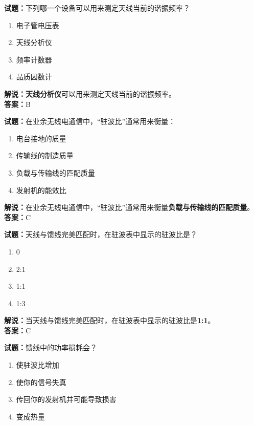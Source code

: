 \documentclass{ctexbook}
\begin{document}
\noindent\textbf{试题：}下列哪一个设备可以用来测定天线当前的谐振频率？

\begin{enumerate}[leftmargin=3em]
  \item 电子管电压表
  \item 天线分析仪
  \item 频率计数器
  \item 品质因数计
\end{enumerate}

\noindent\textbf{解说：}\textbf{天线分析仪}可以用来测定天线当前的谐振频率。\\\noindent\textbf{答案：}B

\vspace{\baselineskip}

\noindent\textbf{试题：}在业余无线电通信中，“驻波比”通常用来衡量：

\begin{enumerate}[leftmargin=3em]
  \item 电台接地的质量
  \item 传输线的制造质量
  \item 负载与传输线的匹配质量
  \item 发射机的能效比
\end{enumerate}

\noindent\textbf{解说：}在业余无线电通信中，“驻波比”通常用来衡量\textbf{负载与传输线的匹配质量}。\\\noindent\textbf{答案：}C

\vspace{\baselineskip}

\noindent\textbf{试题：}天线与馈线完美匹配时，在驻波表中显示的驻波比是？

\begin{enumerate}[leftmargin=3em]
  \item 0
  \item 2:1
  \item 1:1
  \item 1:3
\end{enumerate}

\noindent\textbf{解说：}当天线与馈线完美匹配时，在驻波表中显示的驻波比是\textbf{1:1}。\\\noindent\textbf{答案：}C

\vspace{\baselineskip}

\noindent\textbf{试题：}馈线中的功率损耗会？

\begin{enumerate}[leftmargin=3em]
  \item 使驻波比增加
  \item 使你的信号失真
  \item 传回你的发射机并可能导致损害
  \item 变成热量
\end{enumerate}
\end{document}
